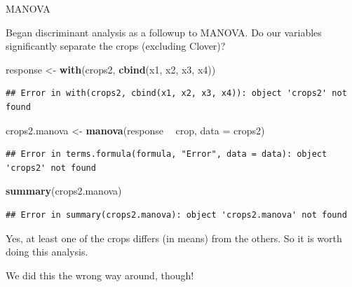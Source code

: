 \documentclass[ignorenonframetext,]{beamer}
\newenvironment{Shaded}{\begin{snugshade}}{\end{snugshade}}
\newcommand{\DataTypeTok}[1]{\textcolor[rgb]{0.13,0.29,0.53}{#1}}
\newcommand{\KeywordTok}[1]{\textcolor[rgb]{0.13,0.29,0.53}{\textbf{#1}}}
\newcommand{\NormalTok}[1]{#1}
\newcommand{\OperatorTok}[1]{\textcolor[rgb]{0.81,0.36,0.00}{\textbf{#1}}}
\newcommand{\StringTok}[1]{\textcolor[rgb]{0.31,0.60,0.02}{#1}}
\begin{document}
\begin{frame}[fragile]{MANOVA}
\protect\hypertarget{manova-1}{}

Began discriminant analysis as a followup to MANOVA. Do our variables
significantly separate the crops (excluding Clover)?

\begin{Shaded}
\begin{Highlighting}[]
\NormalTok{response <-}\StringTok{ }\KeywordTok{with}\NormalTok{(crops2, }\KeywordTok{cbind}\NormalTok{(x1, x2, x3, x4))}
\end{Highlighting}
\end{Shaded}

\begin{verbatim}
## Error in with(crops2, cbind(x1, x2, x3, x4)): object 'crops2' not found
\end{verbatim}

\begin{Shaded}
\begin{Highlighting}[]
\NormalTok{crops2.manova <-}\StringTok{ }\KeywordTok{manova}\NormalTok{(response }\OperatorTok{~}\StringTok{ }\NormalTok{crop, }\DataTypeTok{data =}\NormalTok{ crops2)}
\end{Highlighting}
\end{Shaded}

\begin{verbatim}
## Error in terms.formula(formula, "Error", data = data): object 'crops2' not found
\end{verbatim}

\begin{Shaded}
\begin{Highlighting}[]
\KeywordTok{summary}\NormalTok{(crops2.manova)}
\end{Highlighting}
\end{Shaded}

\begin{verbatim}
## Error in summary(crops2.manova): object 'crops2.manova' not found
\end{verbatim}

Yes, at least one of the crops differs (in means) from the others. So it
is worth doing this analysis.

We did this the wrong way around, though!

\end{frame}
\end{document}
